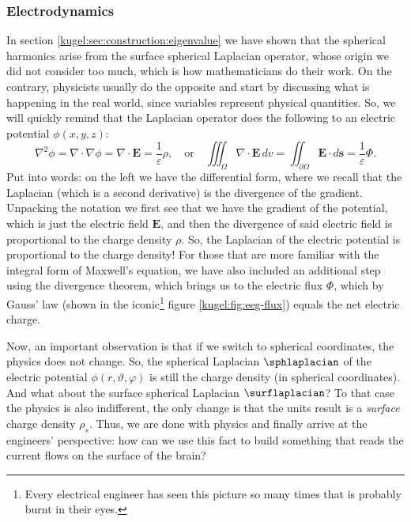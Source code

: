 \subsubsection{Electrodynamics}
\nocite{griffiths_introduction_2015}

In section \ref{kugel:sec:construction:eigenvalue} we have shown that the
spherical harmonics arise from the surface spherical Laplacian operator, whose
origin we did not consider too much, which is how mathematicians do their work.
On the contrary, physicists usually do the opposite and start by discussing what
is happening in the real world, since variables represent physical quantities.
So, we will quickly remind that the Laplacian operator does the following to an
electric potential $\phi(x, y, z)$:
\begin{equation*}
  \nabla^2 \phi
  = \nabla \cdot \nabla \phi
  = \nabla \cdot \mathbf{E}
  = \frac{1}{\varepsilon} \rho,
  \quad \text{or} \quad
  \iiint_\Omega \nabla \cdot \mathbf{E} \, dv
  = \iint_{\partial \Omega} \mathbf{E} \cdot d\mathbf{s}
  = \frac{1}{\varepsilon} \Phi.
\end{equation*}
Put into words: on the left we have the differential form, where we recall that
the Laplacian (which is a second derivative) is the divergence of the gradient.
Unpacking the notation we first see that we have the gradient of the potential,
which is just the electric field $\mathbf{E}$, and then the divergence of said
electric field is proportional to the charge density $\rho$. So, the Laplacian
of the electric potential is proportional to the charge density! For those that
are more familiar with the integral form of Maxwell's equation, we have also
included an additional step using the divergence theorem, which brings us to the
electric flux $\Phi$, which by Gauss' law (shown in the iconic\footnote{Every
electrical engineer has seen this picture so many times that is probably burnt
in their eyes.} figure \ref{kugel:fig:eeg-flux}) equals the net electric charge.

Now, an important observation is that if we switch to spherical coordinates, the
physics does not change. So, the spherical Laplacian $\sphlaplacian$ of the
electric potential $\phi(r, \vartheta, \varphi)$ is still the charge density (in
spherical coordinates). And what about the surface spherical Laplacian
$\surflaplacian$? To that case the physics is also indifferent, the only change
is that the units result is a \emph{surface} charge density $\rho_s$. Thus, we
are done with physics and finally arrive at the engineers' perspective: how can
we use this fact to build something that reads the current flows on the surface
of the brain?

